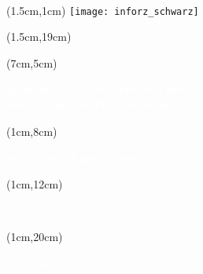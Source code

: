 \begin{titlepage}~


	\begin{textblock*}{12cm}(1.5cm,1cm)
		\texttt{[image: inforz\_schwarz]}
	\end{textblock*}


	\begin{textblock*}{12cm}(1.5cm,19cm)
	\end{textblock*}

	\begin{textblock*}{7cm}(7cm,5cm)
		\begin{flushright}
			\large\sffamily\textbf{
				\textcolor{white}{Zeitschrift der Studierenden der}\\
				\textcolor{white}{Informatik der TU Darmstadt}}
		\end{flushright}
	\end{textblock*}



	\begin{textblock*}{5cm}(1cm,8cm)
		\begin{rotate}{90}
			\sffamily\huge\textbf{
				\textcolor{white}{Inforz zur Winterophase \the\year}}
		\end{rotate}
	\end{textblock*}


	\begin{textblock*}{2cm}(1cm,12cm)
		\begin{rotate}{90}
			\sffamily\tiny \textcolor{white}{Preis: unbezahlbar}
		\end{rotate}
	\end{textblock*}


	\begin{textblock*}{2cm}(1cm,20cm)
		\begin{rotate}{90}
			\sffamily \textcolor{white}{ISSN: 1614-4295}
		\end{rotate}
	\end{textblock*}

\end{titlepage}
\newpage
